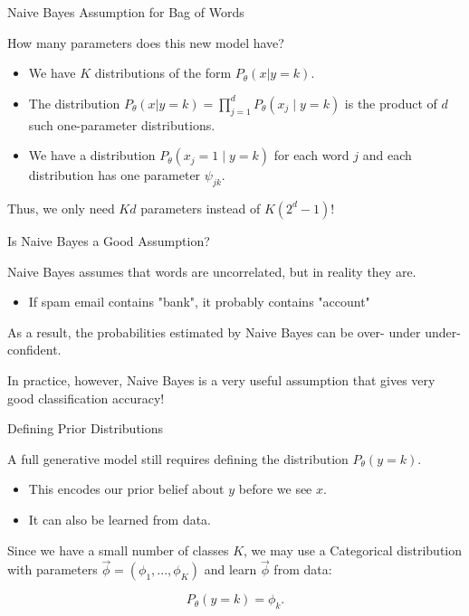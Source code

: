 \documentclass[../../main.tex]{subfiles}
\begin{document}
\begin{frame}[fragile]{Naive Bayes Assumption for Bag of Words}

How many parameters does this new model have?

\begin{itemize}
    \item We have $K$ distributions of the form $P_\theta(x|y=k)$.
    \item The distribution $P_\theta(x|y=k) = \prod_{j=1}^d P_\theta(x_j \mid y=k)$ is the product of $d$ such one-parameter distributions.
    \item We have a distribution $P_\theta(x_j = 1 \mid y=k)$ for each word $j$ and each distribution has one parameter $\psi_{jk}$.
\end{itemize}

Thus, we only need $Kd$ parameters instead of $K(2^d-1)$!

\end{frame}

\begin{frame}[fragile]{Is Naive Bayes a Good Assumption?}



Naive Bayes assumes that words are uncorrelated, but in reality they are.
  \begin{itemize}
      \item If spam email contains "bank", it probably contains "account"
  \end{itemize}

As a result, the probabilities estimated by Naive Bayes can be over- under under-confident.

\vspace{0.2cm}

In practice, however, Naive Bayes is a very useful assumption that gives very good classification accuracy!



\end{frame}
\begin{frame}[fragile]{Defining Prior Distributions }


A full generative model still requires defining the distribution $P_\theta(y=k)$.

\begin{itemize}
    \item This encodes our prior belief about $y$ before we see $x$.
    \item It can also be learned from data.
\end{itemize}

\vspace{0.2cm}


Since we have a small number of classes $K$, we may use a Categorical distribution with parameters $\vec\phi = (\phi_1,...,\phi_K)$ and learn $\vec\phi$ from data:

$$ P_\theta(y=k) = \phi_k.$$

\end{frame}
\end{document}
